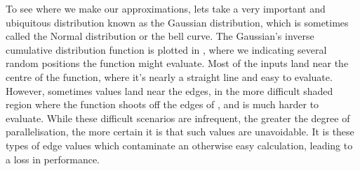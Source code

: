 \documentclass[11pt,a4paper,oneside,english]{extarticle}
\begin{document}
To see where we make our approximations, lets take a very important and ubiquitous distribution known as the Gaussian distribution, which is sometimes called the Normal distribution or the bell curve. The Gaussian's inverse cumulative distribution function is plotted in ,
where we indicating several random positions the function might evaluate. Most of the inputs land near the centre of the function, where it's nearly a straight line and easy to evaluate. However, sometimes values land near the edges, in the more difficult shaded region where the function shoots off the edges of , and is much harder to evaluate. While these difficult scenarios are infrequent, the greater the degree of parallelisation, the more certain it is that such values are unavoidable. It is these types of edge values which contaminate an otherwise easy calculation, leading to a loss in performance. 
\end{document}
